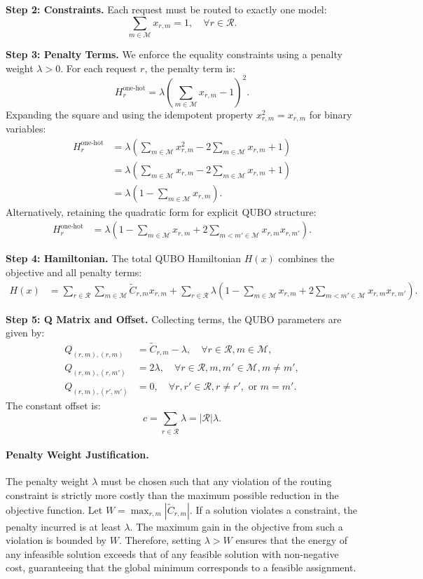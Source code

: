 \documentclass[12pt]{article}
\begin{document}
\textbf{Step 2: Constraints.}
Each request must be routed to exactly one model:
\[
\sum_{m \in \mathcal{M}} x_{r,m} = 1, \quad \forall r \in \mathcal{R}.
\]

\textbf{Step 3: Penalty Terms.}
We enforce the equality constraints using a penalty weight $\lambda > 0$. For each request $r$, the penalty term is:
\[
H_r^{\text{one-hot}} = \lambda \left( \sum_{m \in \mathcal{M}} x_{r,m} - 1 \right)^2.
\]
Expanding the square and using the idempotent property $x_{r,m}^2 = x_{r,m}$ for binary variables:
\begin{align}
H_r^{\text{one-hot}} &= \lambda \left( \sum_{m \in \mathcal{M}} x_{r,m}^2 - 2 \sum_{m \in \mathcal{M}} x_{r,m} + 1 \right) \\
&= \lambda \left( \sum_{m \in \mathcal{M}} x_{r,m} - 2 \sum_{m \in \mathcal{M}} x_{r,m} + 1 \right) \\
&= \lambda \left( 1 - \sum_{m \in \mathcal{M}} x_{r,m} \right).
\end{align}
Alternatively, retaining the quadratic form for explicit QUBO structure:
\begin{align}
H_r^{\text{one-hot}} &= \lambda \left( 1 - \sum_{m \in \mathcal{M}} x_{r,m} + 2 \sum_{m < m' \in \mathcal{M}} x_{r,m} x_{r,m'} \right).
\end{align}

\textbf{Step 4: Hamiltonian.}
The total QUBO Hamiltonian $H(x)$ combines the objective and all penalty terms:
\begin{align}
H(x) &= \sum_{r \in \mathcal{R}} \sum_{m \in \mathcal{M}} \tilde{C}_{r,m} x_{r,m} + \sum_{r \in \mathcal{R}} \lambda \left( 1 - \sum_{m \in \mathcal{M}} x_{r,m} + 2 \sum_{m < m' \in \mathcal{M}} x_{r,m} x_{r,m'} \right).
\end{align}

\textbf{Step 5: Q Matrix and Offset.}
Collecting terms, the QUBO parameters are given by:
\begin{align}
Q_{(r,m),(r,m)} &= \tilde{C}_{r,m} - \lambda, \quad \forall r \in \mathcal{R}, m \in \mathcal{M}, \\
Q_{(r,m),(r,m')} &= 2\lambda, \quad \forall r \in \mathcal{R}, m, m' \in \mathcal{M}, m \neq m', \\
Q_{(r,m),(r',m')} &= 0, \quad \forall r, r' \in \mathcal{R}, r \neq r', \text{ or } m=m'.
\end{align}
The constant offset is:
\[
c = \sum_{r \in \mathcal{R}} \lambda = |\mathcal{R}| \lambda.
\]

\paragraph{Penalty Weight Justification.}
The penalty weight $\lambda$ must be chosen such that any violation of the routing constraint is strictly more costly than the maximum possible reduction in the objective function. Let $W = \max_{r,m} |\tilde{C}_{r,m}|$. If a solution violates a constraint, the penalty incurred is at least $\lambda$. The maximum gain in the objective from such a violation is bounded by $W$. Therefore, setting $\lambda > W$ ensures that the energy of any infeasible solution exceeds that of any feasible solution with non-negative cost, guaranteeing that the global minimum corresponds to a feasible assignment.
\end{document}
